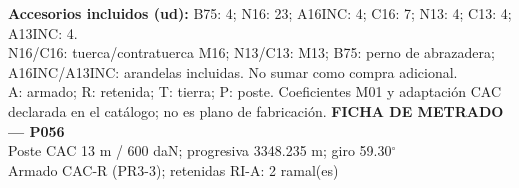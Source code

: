 \begingroup\scriptsize
\textbf{Accesorios incluidos (ud):} B75: 4; N16: 23; A16INC: 4; C16: 7; N13: 4; C13: 4; A13INC: 4.\\
N16/C16: tuerca/contratuerca M16; N13/C13: M13; B75: perno de abrazadera; A16INC/A13INC: arandelas incluidas. No sumar como compra adicional.\\
A: armado; R: retenida; T: tierra; P: poste. Coeficientes M01 y adaptación CAC declarada en el catálogo; no es plano de fabricación.
\endgroup\endgroup
\clearpage{}
\begingroup\small\setlength{\parskip}{3pt}\renewcommand{\arraystretch}{1.05}
\textbf{\large FICHA DE METRADO — P056}\\[4pt]
Poste CAC 13 m / 600 daN; progresiva 3348.235 m; giro 59.30\ensuremath{^\circ}\\
Armado CAC-R (PR3-3); retenidas RI-A: 2 ramal(es)\\
\begingroup\scriptsize
